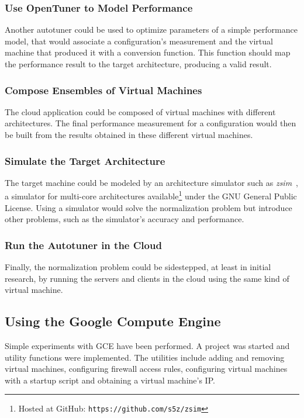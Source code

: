 \documentclass[a4paper, 12pt]{article}
\begin{document}
\subsubsection{Use OpenTuner to Model Performance}

Another autotuner could be used to optimize parameters
of a simple performance model, that would associate
a configuration's measurement and the virtual machine
that produced it with a conversion function. This function
should map the performance result to the target architecture,
producing a valid result.

\subsubsection{Compose Ensembles of Virtual Machines}

The cloud application could be composed of virtual machines
with different architectures. The final performance measurement
for a configuration would then be built from the results obtained
in these different virtual machines.

\subsubsection{Simulate the Target Architecture}

The target machine could be modeled by an architecture
simulator such as \emph{zsim}~\cite{sanchez2013zsim},
a simulator for multi-core architectures
available\footnote{Hosted at GitHub: \texttt{\scriptsize https://github.com/s5z/zsim}}
under the GNU General Public License.
Using a simulator would solve the normalization problem but introduce
other problems, such as the simulator's accuracy and performance.

\subsubsection{Run the Autotuner in the Cloud}

Finally, the normalization problem could be sidestepped, at least
in initial research, by running the servers and clients in the cloud
using the same kind of virtual machine.

\subsection{Using the Google Compute Engine} \label{sec:pwork}

Simple experiments with GCE have been performed. A project
was started and utility functions were implemented.
The utilities include adding and removing virtual machines,
configuring firewall access rules, configuring virtual machines
with a startup script and obtaining a virtual machine's IP.
\end{document}
